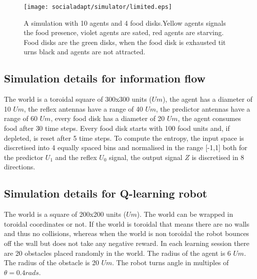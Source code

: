 \begin{figure}[htb]
\begin{centering}
\texttt{[image: socialadapt/simulator/limited.eps]}
\small{
\caption[Software simulation in Enki B]{A simulation with 10 agents and 4 food disks.Yellow agents signals the
food presence, violet agents are sated, red agents are starving.
Food disks are the green disks, when the food disk is exhausted tit urns black
and agents are not attracted. \label{fig:screen2}}
}
\end{centering}
\end{figure}

\subsection{Simulation details for information flow}
\label{Appendix:InfoFlowSimDetails}
The world is a toroidal square of 300x300 units ($Um$), the agent has a diameter of 10 $Um$,
the reflex antennas have a range of 40 $Um$, the predictor antennas have a range of 60 $Um$,
every food disk has a diameter of 20 $Um$, the agent consumes food after $30$ time steps.
Every food disk starts with 100 food units and, if depleted, is reset after 5 time steps.
To compute the entropy, the input space is discretised into 4 equally spaced bins
and normalised in the range [-1,1]
both for the predictor $U_1$ and the reflex $U_0$ signal, the output signal $Z$
is discretised in 8 directions.

\subsection{Simulation details for Q-learning robot}
\label{Appendix:QLearnSimDetails}
The world is a square of 200x200 units ($Um$). The world can be wrapped
in toroidal coordinates or not.
If the world is toroidal that means there are no walls and thus no collisions,
whereas when the world is non toroidal the robot bounces off the wall but
does not take any negative reward.
In each learning session there are 20 obstacles placed randomly in the world.
The radius of the agent is 6 $Um$. The radius of the obstacle is 20 $Um$.
The robot turns angle in multiples of $\theta=0.4 rads$.

